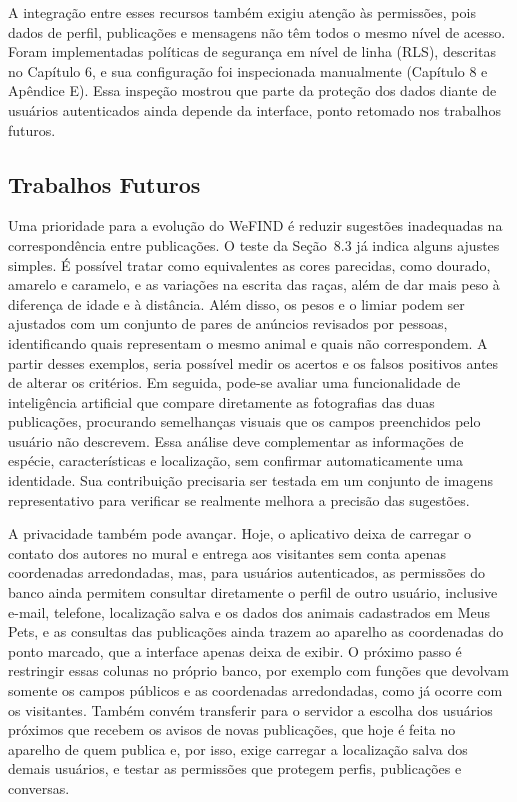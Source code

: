 A integração entre esses recursos também exigiu atenção às permissões, pois dados de perfil, publicações e mensagens não têm todos o mesmo nível de acesso. Foram implementadas políticas de segurança em nível de linha (RLS), descritas no Capítulo 6, e sua configuração foi inspecionada manualmente (Capítulo 8 e Apêndice E). Essa inspeção mostrou que parte da proteção dos dados diante de usuários autenticados ainda depende da interface, ponto retomado nos trabalhos futuros.

\subsection{Trabalhos Futuros}

Uma prioridade para a evolução do WeFIND é reduzir sugestões inadequadas na correspondência entre publicações. O teste da Seção~8.3 já indica alguns ajustes simples. É possível tratar como equivalentes as cores parecidas, como dourado, amarelo e caramelo, e as variações na escrita das raças, além de dar mais peso à diferença de idade e à distância. Além disso, os pesos e o limiar podem ser ajustados com um conjunto de pares de anúncios revisados por pessoas, identificando quais representam o mesmo animal e quais não correspondem. A partir desses exemplos, seria possível medir os acertos e os falsos positivos antes de alterar os critérios. Em seguida, pode-se avaliar uma funcionalidade de inteligência artificial que compare diretamente as fotografias das duas publicações, procurando semelhanças visuais que os campos preenchidos pelo usuário não descrevem. Essa análise deve complementar as informações de espécie, características e localização, sem confirmar automaticamente uma identidade. Sua contribuição precisaria ser testada em um conjunto de imagens representativo para verificar se realmente melhora a precisão das sugestões.

A privacidade também pode avançar. Hoje, o aplicativo deixa de carregar o contato dos autores no mural e entrega aos visitantes sem conta apenas coordenadas arredondadas, mas, para usuários autenticados, as permissões do banco ainda permitem consultar diretamente o perfil de outro usuário, inclusive e-mail, telefone, localização salva e os dados dos animais cadastrados em Meus Pets, e as consultas das publicações ainda trazem ao aparelho as coordenadas do ponto marcado, que a interface apenas deixa de exibir. O próximo passo é restringir essas colunas no próprio banco, por exemplo com funções que devolvam somente os campos públicos e as coordenadas arredondadas, como já ocorre com os visitantes. Também convém transferir para o servidor a escolha dos usuários próximos que recebem os avisos de novas publicações, que hoje é feita no aparelho de quem publica e, por isso, exige carregar a localização salva dos demais usuários, e testar as permissões que protegem perfis, publicações e conversas.


